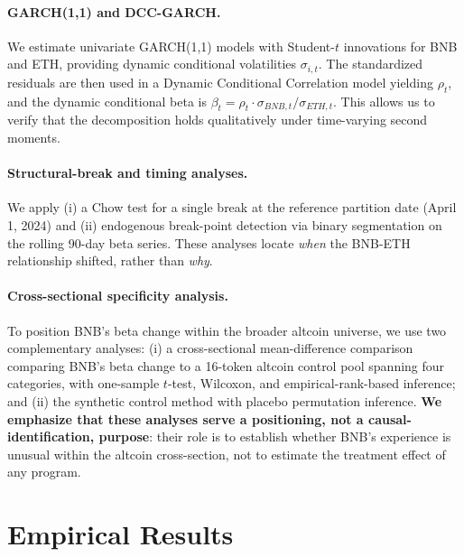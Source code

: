 \documentclass[11pt,a4paper]{article}
\begin{document}
\paragraph{GARCH(1,1) and DCC-GARCH.} We estimate univariate GARCH(1,1) models with Student-$t$ innovations for BNB and ETH, providing dynamic conditional volatilities $\sigma_{i,t}$. The standardized residuals are then used in a Dynamic Conditional Correlation model \citep{engle2002} yielding $\rho_t$, and the dynamic conditional beta is $\beta_t = \rho_t \cdot \sigma_{BNB,t} / \sigma_{ETH,t}$. This allows us to verify that the decomposition holds qualitatively under time-varying second moments.

\paragraph{Structural-break and timing analyses.} We apply (i) a Chow test for a single break at the reference partition date (April 1, 2024) and (ii) endogenous break-point detection via binary segmentation \citep{baiperron} on the rolling 90-day beta series. These analyses locate \emph{when} the BNB-ETH relationship shifted, rather than \emph{why}.

\paragraph{Cross-sectional specificity analysis.} To position BNB's beta change within the broader altcoin universe, we use two complementary analyses: (i) a cross-sectional mean-difference comparison \citep[in the spirit of][]{abadie2010,callaway2021} comparing BNB's beta change to a 16-token altcoin control pool spanning four categories, with one-sample $t$-test, Wilcoxon, and empirical-rank-based inference; and (ii) the synthetic control method \citep{abadie2010} with placebo permutation inference. \textbf{We emphasize that these analyses serve a positioning, not a causal-identification, purpose}: their role is to establish whether BNB's experience is unusual within the altcoin cross-section, not to estimate the treatment effect of any program.

\section{Empirical Results} \label{sec:results}
\end{document}
